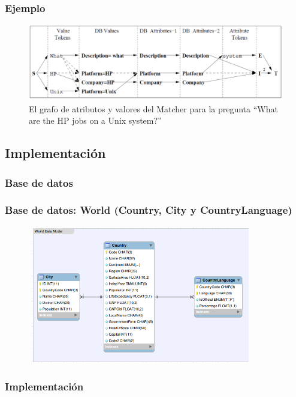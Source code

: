 \begin{frame}

\frametitle{Ejemplo}

\begin{figure}
  \centering
    \includegraphics[scale=0.3]{graficos/popescu-example-2}
  \caption{El grafo de atributos y valores del Matcher para la pregunta ``What are the HP jobs on a Unix system?''}
  \label{fig:popescu-example-2}
\end{figure}
\end{frame}

\subsection{Implementación}

\subsubsection*{Base de datos}
\begin{frame}
\frametitle{Base de datos: World (Country, City y CountryLanguage)}
\begin{figure}
    \includegraphics[width=9.823cm,height=6.004cm]{graficos/fuentes/world-db.png}
\end{figure}
\end{frame}


\subsubsection*{Implementación}


